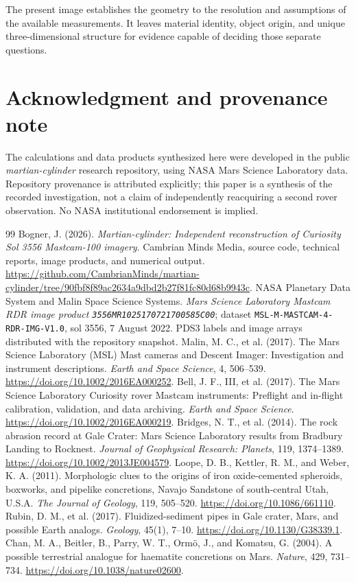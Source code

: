 \documentclass[11pt,letterpaper]{article}
\newcommand{\pdsid}{\texttt{3556MR1025170721700585C00}}
\begin{document}
The present image establishes the geometry to the resolution and assumptions of the available measurements. It leaves material identity, object origin, and unique three-dimensional structure for evidence capable of deciding those separate questions.

\section*{Acknowledgment and provenance note}
The calculations and data products synthesized here were developed in the public \emph{martian-cylinder} research repository, using NASA Mars Science Laboratory data. Repository provenance is attributed explicitly; this paper is a synthesis of the recorded investigation, not a claim of independently reacquiring a second rover observation. No NASA institutional endorsement is implied.

\begin{thebibliography}{99}\setlength{\itemsep}{4pt}
 Bogner, J. (2026). \emph{Martian-cylinder: Independent reconstruction of Curiosity Sol 3556 Mastcam-100 imagery}. Cambrian Minds Media, source code, technical reports, image products, and numerical output. \url{https://github.com/CambrianMinds/martian-cylinder/tree/90fbf8f89ac2634a9dbd2b27f81fc80d68b9943c}.
 NASA Planetary Data System and Malin Space Science Systems. \emph{Mars Science Laboratory Mastcam RDR image product \pdsid}; dataset \texttt{MSL-M-MASTCAM-4-RDR-IMG-V1.0}, sol 3556, 7 August 2022. PDS3 labels and image arrays distributed with the repository snapshot.
 Malin, M. C., et al. (2017). The Mars Science Laboratory (MSL) Mast cameras and Descent Imager: Investigation and instrument descriptions. \emph{Earth and Space Science}, 4, 506--539. \url{https://doi.org/10.1002/2016EA000252}.
 Bell, J. F., III, et al. (2017). The Mars Science Laboratory Curiosity rover Mastcam instruments: Preflight and in-flight calibration, validation, and data archiving. \emph{Earth and Space Science}. \url{https://doi.org/10.1002/2016EA000219}.
 Bridges, N. T., et al. (2014). The rock abrasion record at Gale Crater: Mars Science Laboratory results from Bradbury Landing to Rocknest. \emph{Journal of Geophysical Research: Planets}, 119, 1374--1389. \url{https://doi.org/10.1002/2013JE004579}.
 Loope, D. B., Kettler, R. M., and Weber, K. A. (2011). Morphologic clues to the origins of iron oxide-cemented spheroids, boxworks, and pipelike concretions, Navajo Sandstone of south-central Utah, U.S.A. \emph{The Journal of Geology}, 119, 505--520. \url{https://doi.org/10.1086/661110}.
 Rubin, D. M., et al. (2017). Fluidized-sediment pipes in Gale crater, Mars, and possible Earth analogs. \emph{Geology}, 45(1), 7--10. \url{https://doi.org/10.1130/G38339.1}.
 Chan, M. A., Beitler, B., Parry, W. T., Orm\"o, J., and Komatsu, G. (2004). A possible terrestrial analogue for haematite concretions on Mars. \emph{Nature}, 429, 731--734. \url{https://doi.org/10.1038/nature02600}.
\end{thebibliography}
\end{document}

